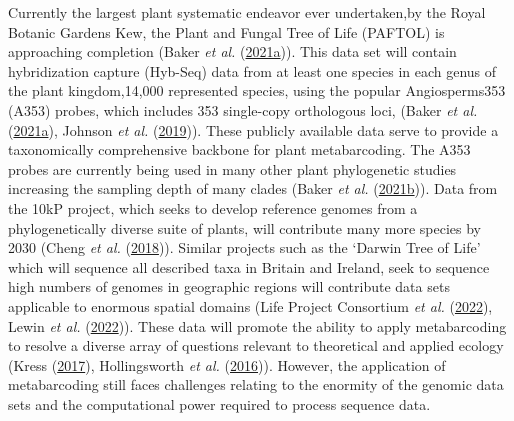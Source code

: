 \documentclass[
]{article}
\begin{document}
Currently the largest plant systematic endeavor ever undertaken,by the
Royal Botanic Gardens Kew, the Plant and Fungal Tree of Life (PAFTOL) is
approaching completion (Baker \emph{et al.}
(\protect\hyperlink{ref-baker2021PAFTOL}{2021a})). This data set will
contain hybridization capture (Hyb-Seq) data from at least one species
in each genus of the plant kingdom,14,000 represented species, using the
popular Angiosperms353 (A353) probes, which includes 353 single-copy
orthologous loci, (Baker \emph{et al.}
(\protect\hyperlink{ref-baker2021PAFTOL}{2021a}), Johnson \emph{et al.}
(\protect\hyperlink{ref-johnson2019universal}{2019})). These publicly
available data serve to provide a taxonomically comprehensive backbone
for plant metabarcoding. The A353 probes are currently being used in
many other plant phylogenetic studies increasing the sampling depth of
many clades (Baker \emph{et al.}
(\protect\hyperlink{ref-baker2021exploring}{2021b})). Data from the 10kP
project, which seeks to develop reference genomes from a
phylogenetically diverse suite of plants, will contribute many more
species by 2030 (Cheng \emph{et al.}
(\protect\hyperlink{ref-cheng2018tenkp}{2018})). Similar projects such
as the `Darwin Tree of Life' which will sequence all described taxa in
Britain and Ireland, seek to sequence high numbers of genomes in
geographic regions will contribute data sets applicable to enormous
spatial domains (Life Project Consortium \emph{et al.}
(\protect\hyperlink{ref-darwin2022project}{2022}), Lewin \emph{et al.}
(\protect\hyperlink{ref-lewin2022biogenome}{2022})). These data will
promote the ability to apply metabarcoding to resolve a diverse array of
questions relevant to theoretical and applied ecology (Kress
(\protect\hyperlink{ref-kress2017plant}{2017}), Hollingsworth \emph{et
al.} (\protect\hyperlink{ref-hollingsworth2016telling}{2016})). However,
the application of metabarcoding still faces challenges relating to the
enormity of the genomic data sets and the computational power required
to process sequence data.
\end{document}
